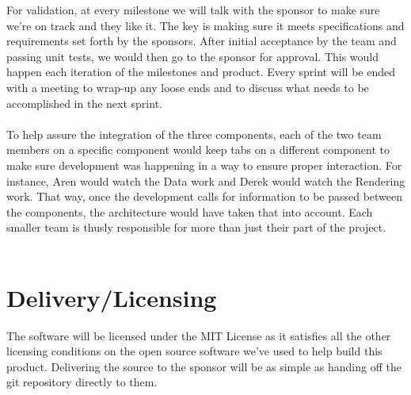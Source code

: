\documentclass[12pt, letterpaper]{article}
\begin{document}
	For validation, at every milestone we will talk with the sponsor to make
    sure we're on track and they like it. The key is making sure it meets
    specifications and requirements set forth by the sponsors. After initial
    acceptance by the team and passing unit tests, we would then go to the
    sponsor for approval. This would happen each iteration of the milestones and
    product. Every sprint will be ended with a meeting to wrap-up any loose ends
    and to discuss what needs to be accomplished in the next sprint.
	\\\\
	To help assure the integration of the three components, each of the two team
    members on a specific component would keep tabs on a different component to
    make sure development was happening in a way to ensure proper interaction.
    For instance, Aren would watch the Data work and Derek would watch the
    Rendering work. That way, once the development calls for information to be
    passed between the components, the architecture would have taken that into
    account. Each smaller team is thusly responsible for more than just their
    part of the project.\\\\

\section{Delivery/Licensing}

The software will be licensed under the MIT License as it satisfies all the other
licensing conditions on the open source software we've used to help build this
product. Delivering the source to the sponsor will be as simple as handing off the
git repository directly to them.
\end{document}
